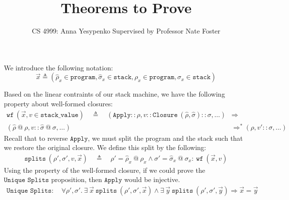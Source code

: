 \documentclass[11pt]{article}
\begin{document}
\title{Theorems to Prove}
\author{CS 4999: Anna Yesypenko Supervised by Professor Nate Foster}
\maketitle

We introduce the following notation: $$\vec{x} \triangleq (\hat{\rho}_x \in \texttt{program}, \hat{\sigma}_x \in \texttt{stack}, \rho_x \in \texttt{program}, \sigma_x \in \texttt{stack})$$

Based on the linear contraints of our stack machine, we have the following property about well-formed closures:
\begin{align*}
    \texttt{wf}\ (\vec{x}, v \in \texttt{stack\_value}) \quad \triangleq \quad (\texttt{Apply}::\rho, v::\texttt{Closure}\ (\hat{\rho}, \hat{\sigma})::\sigma, \dots) &\Longrightarrow\\
    (\hat{\rho}\ @\ \rho, v::\hat{\sigma}\ @\ \sigma, \dots) &\Longrightarrow^* (\rho, v'::\sigma, \dots)
\end{align*}
Recall that to reverse $\texttt{Apply}$, we must split the program and the stack such that we restore the original closure. We define this split by the following:
\begin{align*}
    \texttt{splits}\ (\rho', \sigma', v, \vec{x}) \quad \triangleq \quad \rho' = \hat{\rho}_x\ @\ \rho_x \wedge \sigma' = \hat{\sigma}_x\ @\ \sigma_x: \ \texttt{wf}\ (\vec{x}, v)
\end{align*}
Using the property of the well-formed closure, if we could prove the $\texttt{Unique Splits}$ proposition, then $\texttt{Apply}$ would be injective.
\begin{align*}
    \texttt{Unique Splits}: \quad \forall \rho', \sigma'.\ \exists\ \vec{x}\ \texttt{splits}\ (\rho', \sigma', \vec{x}) \wedge \exists\ \vec{y}\ \texttt{splits}\ (\rho', \sigma', \vec{y}) \Longrightarrow \vec{x} = \vec{y}
\end{align*}
\end{document}
